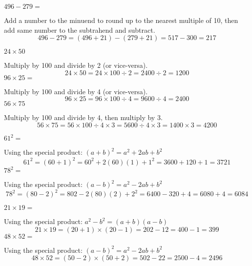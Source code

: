 \begin{example}
\Item $496-279 =$

Add a number to the minuend to round up to the nearest multiple of 10, then add same
number to the subtrahend and subtract.
\begin{equation*}
496 - 279 = (496 + 21) - (279 + 21) = 517 - 300 = 217
\end{equation*}
\end{example}

\begin{example}
\Item $24\times 50$

Multiply by 100 and divide by 2 (or vice-versa).
\begin{equation*}
24 \times 50 = 24 \times 100 \div 2 = 2400 \div 2 = 1200
\end{equation*}
\Item $96\times 25=$

Multiply by 100 and divide by 4 (or vice-versa).
\begin{equation*}
96 \times 25 = 96 \times 100 \div 4 = 9600 \div 4 = 2400
\end{equation*}
\Item $56\times 75$

Multiply by 100 and divide by 4, then multiply by 3.
\begin{equation*}
56 \times 75 = 56 \times 100 \div 4 \times 3 = 5600 \div 4 \times 3 = 1400 \times 3 = 4200
\end{equation*}
\end{example}

\begin{example}
\Item $61^2=$

Using the special product: $(a+b)^2=a^2+2ab+b^2$
\begin{equation*}
61^2 = (60 + 1)^2 = 60^2 + 2(60)(1) + 1^2 = 3600 + 120 + 1 = 3721
\end{equation*}
\Item $78^2=$

Using the special product: $(a-b)^2=a^2-2ab+b^2$
\begin{equation*}
78^2 = (80 - 2)^2 = 802 - 2(80)(2) + 2^2 = 6400 - 320 + 4 = 6080 + 4 = 6084
\end{equation*}
\end{example}

\begin{example}
\Item $21\times 19=$

Using the special product: $a^2-b^2=(a+b)(a-b)$
\begin{equation*}
21 \times 19 = (20 + 1)\times (20 - 1) = 202 - 12 = 400 - 1 = 399
\end{equation*}
\Item $48\times 52=$

Using the special product: $(a-b)^2=a^2-2ab+b^2$
\begin{equation*}
48 \times 52 = (50 - 2)\times (50 + 2) = 502 - 22 = 2500 - 4 = 2496
\end{equation*}
\end{example}

